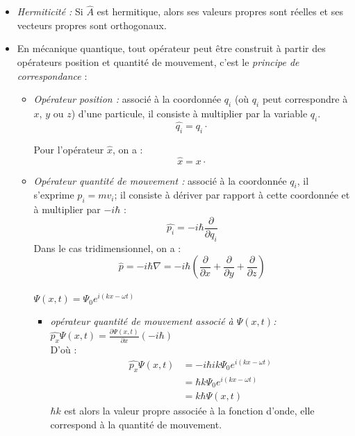 \documentclass[../main.tex]{subfile}
\begin{document}
\begin{itemize}
\begin{itemize}
      \end{itemize}
      
   \item \emph{Hermiticité :} Si $\hat{A}$ est hermitique, alors ses valeurs propres sont réelles et ses vecteurs propres sont orthogonaux.\\

   \item En mécanique quantique, tout opérateur peut être construit à partir des opérateurs position et quantité de mouvement, c'est le \emph{principe de correspondance} :
      \begin{itemize} 
         \item \emph{Opérateur position :} associé à la coordonnée $q_i$ (où $q_i$ peut correspondre à $x$, $y$ ou $z$) d'une particule, il consiste à multiplier par la variable $q_i$.\\
            $$\hat{q_i} = q_i \cdot $$

            Pour l'opérateur $\hat{x}$, on a :
            $$\hat{x} = x \cdot$$
         \item \emph{Opérateur quantité de mouvement :} associé à la coordonnée $q_i$, il s'exprime $p_i = mv_i$; il consiste à dériver par rapport à cette coordonnée et à multiplier par $-i\hbar$ :\\
            $$\hat{p_i} = -i\hbar \frac{\partial}{\partial q_i}$$
            Dans le cas tridimensionnel, on a :
            $$\hat{p} = -i\hbar \nabla = -i \hbar (\frac{\partial}{\partial x} + \frac{\partial}{\partial y} + \frac{\partial}{\partial z}) $$

            \begin{ex}
               $\phantom{a}$\\
               $\Psi(x, t) =\Psi_0 e^{i(kx - \omega t)}$
               \begin{itemize} 
                        \item \emph{opérateur quantité de mouvement associé à $\Psi(x, t)$:} \\
                           $\hat{p_x} \Psi(x, t) = \frac{\partial \Psi(x, t)}{\partial x} (-i \hbar)$\\
                           D'où :
                           $$
                             \begin{aligned} 
                                 \hat{p_x} \Psi(x, t) 
                                 &= -i \hbar i k \Psi_0 e^{i(kx- \omega t)}\\
                                 &= \hbar k \Psi_0 e^{i(kx- \omega t)}\\
                                 &= k \hbar \Psi(x, t)
                             \end{aligned}
                           $$
                           $\hbar k$ est alors la valeur propre associée à la fonction d'onde, elle correspond à la quantité de mouvement.


\end{itemize}
\end{ex}
\end{itemize}
\end{itemize}
\end{document}

